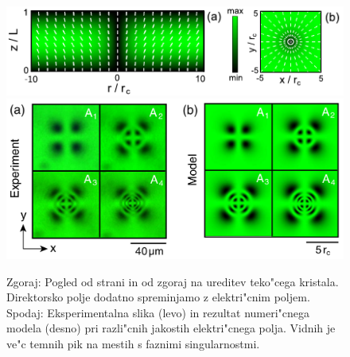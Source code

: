 \documentclass[12pt,twoside,openright,final]{report}
\newcommand{\todo}[1]{(\textbf{\textsmaller{TODO}: #1})}
\begin{document}
\begin{figure}[!htbp]
 \centering
 \includegraphics[width=.8\textwidth]{defekt-array-postavitev}
 \includegraphics[width=.8\textwidth]{defekt-array-brasselet}
 \caption{Zgoraj: Pogled od strani in od zgoraj na ureditev teko"cega kristala. Direktorsko polje dodatno spreminjamo z elektri"cnim poljem. Spodaj: Eksperimentalna slika (levo) in rezultat numeri"cnega modela (desno) pri razli"cnih jakostih elektri"cnega polja. Vidnih je ve"c temnih pik na mestih s faznimi singularnostmi.\cite{brasselet-arrays}}
 \label{fig:defekt-arrays}
\end{figure}

\end{document}
